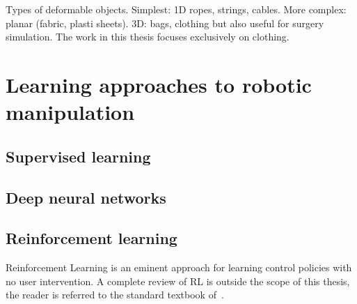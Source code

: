 \documentclass[\home/main.tex]{subfiles}
\begin{document}
Types of deformable objects. Simplest: 1D ropes, strings, cables. More complex: planar (fabric, plasti sheets). 3D: bags, clothing but also useful for surgery simulation. The work in this thesis focuses exclusively on clothing.



\section{Learning approaches to robotic manipulation} \label{sec:lit_learning}

\subsection{Supervised learning} \label{subsec:lit_sl}
\subsection{Deep neural networks} \label{subsec:lit_dnn}
\subsection{Reinforcement learning} \label{subsec:lit_rl}

Reinforcement Learning is an eminent approach for learning control policies with no user intervention. A complete review of RL is outside the scope of this thesis, the reader is referred to the standard textbook of~\citeauthor{SuttonAndBarto}. 
\end{document}
